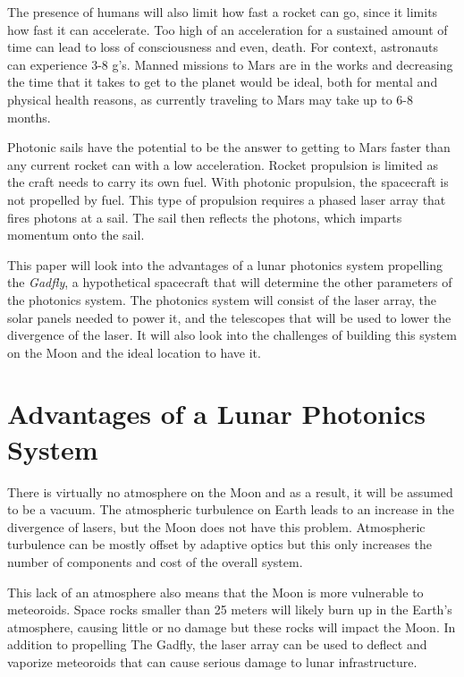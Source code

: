 \documentclass{aa}
\begin{document}
   The presence of humans will also limit how fast a rocket can go, since it limits how fast it can accelerate. Too high of an acceleration for a sustained amount of time can lead to loss of consciousness and even, death. For context, astronauts can experience 3-8 g's. Manned missions to Mars are in the works and decreasing the time that it takes to get to the planet would be ideal, both for mental and physical health reasons, as currently traveling to Mars may take up to 6-8 months.
    
    Photonic sails have the potential to be the answer to getting to Mars faster than any current rocket can with a low acceleration. Rocket propulsion is limited as the craft needs to carry its own fuel. With photonic propulsion, the spacecraft is not propelled by fuel. This type of propulsion requires a phased laser array that fires photons at a sail. The sail then reflects the photons, which imparts momentum onto the sail. 
    
    This paper will look into the advantages of a lunar photonics system propelling the \textit{Gadfly}, a hypothetical spacecraft that will determine the other parameters of the photonics system. The photonics system will consist of the laser array, the solar panels needed to power it, and the telescopes that will be used to lower the divergence of the laser.  It will also look into the challenges of building this system on the Moon and the ideal location to have it.
    
   

\section{Advantages of a Lunar Photonics System}

%
	There is virtually no atmosphere on the Moon and as a result, it will be assumed to be a vacuum. The atmospheric turbulence on Earth leads to an increase in the divergence of lasers, but the Moon does not have this problem. Atmospheric turbulence can be mostly offset by adaptive optics but this only increases the number of components and cost of the overall system.
    
    This lack of an atmosphere also means that the Moon is more vulnerable to meteoroids. Space rocks smaller than 25 meters will likely burn up in the Earth's atmosphere, causing little or no damage but these rocks will impact the Moon. In addition to propelling The Gadfly, the laser array can be used to deflect and vaporize meteoroids that can cause serious damage to lunar infrastructure.
    
\end{document}

